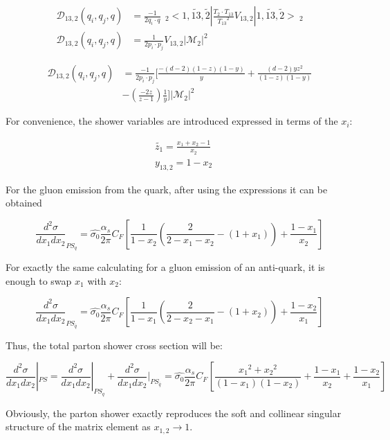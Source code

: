 \begin{equation}
\begin{split}
\mathcal{D}_{13,2} (q_i,q_j,q)&= \frac{-1}{2q_i \cdot q} \:\:_2<1,\tilde{13},\tilde{2} |\frac{T_2 \cdot T_{13}}{{T_{13}}^2} V_{13,2}| 1,\tilde{13},\tilde{2} >\:_2\\
\mathcal{D}_{13,2} (q_i,q_j,q)&=\frac{1}{2p_i \cdot p_j} V_{13,2} |\mathcal{M}_{2}|^2
\end{split}
\end{equation}



\begin{equation}
\begin{split}
\mathcal{D}_{13,2} (q_i,q_j,q) &= \frac{-1}{2p_i \cdot p_j}[\frac{-(d-2)(1-z)(1-y) }{y}+\frac{(d-2)yz^2}{(1-z)(1-y)}\\
&-(\frac{-2z}{z-1}) \frac{1}{y}]|\mathcal{M}_{2}|^2
\end{split}
\end{equation}

For convenience, the shower variables are introduced expressed in terms of the $ x_i $:

\begin{equation}
\begin{split}
&\tilde{z_1}=\frac{x_1+x_2-1}{x_2}\\
&y_{13,2} =1-x_2
\end{split}
\end{equation}

For the gluon emission from the quark, after using the expressions it can be obtained \cite{Schumann:2007mg}

\begin{equation}
\frac{d^2 \sigma}{dx_1 dx_2}_{PS_q}= \hat{\sigma_0}
\frac{\alpha_s}{2\pi} C_F [\frac{1}{1-x_2} (\frac{2}{2-x_1-x_2}-(1+x_1))+\frac{1-x_1}{x_2}]
\end{equation}

For exactly the same calculating for a gluon emission of an anti-quark, it is enough to swap $ x_1 $ with $ x_2 $:

\begin{equation}
\frac{d^2 \sigma}{dx_1 dx_2}_{PS_{\bar{q}}}= \hat{\sigma_0}
\frac{\alpha_s}{2\pi} C_F [\frac{1}{1-x_1} (\frac{2}{2-x_2-x_1}-(1+x_2))+\frac{1-x_2}{x_1}]
\end{equation}

Thus, the total parton shower cross section will be:

\begin{equation}
\frac{d^2 \sigma}{dx_1 dx_2}|_{PS}=\frac{d^2 \sigma}{dx_1 dx_2}|_{PS_q}+\frac{d^2 \sigma}{dx_1 dx_2}|_{PS_{\bar{q}}}= \hat{\sigma_0}
\frac{\alpha_s}{2\pi} C_F [\frac{{x_1}^2+{x_2}^2}{(1-x_1)(1-x_2)}+\frac{1-x_1}{x_2}+\frac{1-x_2}{x_1}]
\end{equation}

Obviously, the parton shower exactly reproduces the soft and collinear singular structure of the matrix element as $ x_{1,2} \rightarrow 1 $.